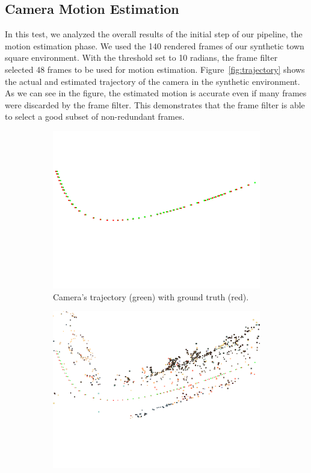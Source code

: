 \subsection{Camera Motion Estimation}
In this test, we analyzed the overall results of the initial step of our
pipeline, the motion estimation phase. We used the 140 rendered frames of our
synthetic town square environment. With the threshold set to 10 radians,
the frame filter selected 48 frames to be used for motion estimation.
Figure~\ref{fig:trajectory} shows the actual
and estimated trajectory of the camera in the synthetic environment.
As we can see in the figure, the estimated motion is accurate even if many
frames were discarded by the frame filter. This demonstrates that the frame filter is able to select a good subset of non-redundant frames.
%
\begin{figure}[h]
\centering
\begin{subfigure}{0.45\linewidth}
\includegraphics[width=\linewidth]{img/snapshot00.png}
\caption{Camera's trajectory (green) with ground truth (red).}
\label{fig:trajectory1}
\end{subfigure}
\begin{subfigure}{0.45\linewidth}
\includegraphics[width=\linewidth]{img/snapshot01.png}

\end{subfigure}
\end{figure}
